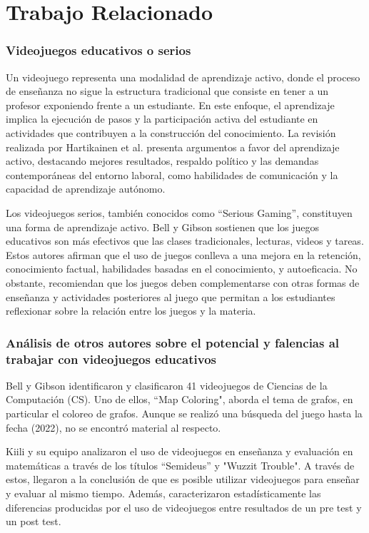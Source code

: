 \chapter{Trabajo Relacionado}


\subsection{Videojuegos educativos o serios}

Un videojuego representa una modalidad de aprendizaje activo, donde el proceso de enseñanza no sigue la estructura tradicional que consiste en tener a un profesor exponiendo frente a un estudiante. En este enfoque, el aprendizaje implica la ejecución de pasos y la participación activa del estudiante en actividades que contribuyen a la construcción del conocimiento. La revisión realizada por Hartikainen et al. \cite{active_learning_review} presenta argumentos a favor del aprendizaje activo, destacando mejores resultados, respaldo político y las demandas contemporáneas del entorno laboral, como habilidades de comunicación y la capacidad de aprendizaje autónomo.

Los videojuegos serios, también conocidos como ``Serious Gaming'', constituyen una forma de aprendizaje activo. Bell y Gibson \cite{evaluation_of_games_for_teaching_cs} sostienen que los juegos educativos son más efectivos que las clases tradicionales, lecturas, videos y tareas. Estos autores afirman que el uso de juegos conlleva a una mejora en la retención, conocimiento factual, habilidades basadas en el conocimiento, y autoeficacia. No obstante, recomiendan que los juegos deben complementarse con otras formas de enseñanza y actividades posteriores al juego que permitan a los estudiantes reflexionar sobre la relación entre los juegos y la materia.

\subsection{Análisis de otros autores sobre el potencial y falencias al trabajar con videojuegos educativos}

Bell y Gibson \cite{evaluation_of_games_for_teaching_cs} identificaron y clasificaron 41 videojuegos de Ciencias de la Computación (CS). Uno de ellos, ``Map Coloring", aborda el tema de grafos, en particular el coloreo de grafos. Aunque se realizó una búsqueda del juego hasta la fecha (2022), no se encontró material al respecto.

Kiili y su equipo \cite{using_videogames_maths} analizaron el uso de videojuegos en enseñanza y evaluación en matemáticas a través de los títulos ``Semideus'' y "Wuzzit Trouble". A través de estos, llegaron a la conclusión de que es posible utilizar videojuegos para enseñar y evaluar al mismo tiempo. Además, caracterizaron estadísticamente las diferencias producidas por el uso de videojuegos entre resultados de un pre test y un post test.

